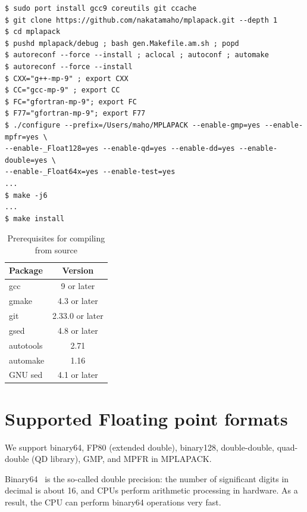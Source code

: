 \documentclass[12pt]{article}
\begin{document}
\begin{verbatim}
$ sudo port install gcc9 coreutils git ccache
$ git clone https://github.com/nakatamaho/mplapack.git --depth 1
$ cd mplapack
$ pushd mplapack/debug ; bash gen.Makefile.am.sh ; popd
$ autoreconf --force --install ; aclocal ; autoconf ; automake
$ autoreconf --force --install
$ CXX="g++-mp-9" ; export CXX
$ CC="gcc-mp-9" ; export CC
$ FC="gfortran-mp-9"; export FC
$ F77="gfortran-mp-9"; export F77
$ ./configure --prefix=/Users/maho/MPLAPACK --enable-gmp=yes --enable-mpfr=yes \
--enable-_Float128=yes --enable-qd=yes --enable-dd=yes --enable-double=yes \
--enable-_Float64x=yes --enable-test=yes
...
$ make -j6
...
$ make install
\end{verbatim}

\begin{table}
\caption{Prerequisites for compiling from source}
\begin{center}\label{prerequisites}
\begin{tabular}{lc}
Package & Version \\ \hline
gcc & 9 or later \\
gmake & 4.3 or later \\
git & 2.33.0 or later\\
gsed & 4.8 or later \\
autotools & 2.71 \\
automake & 1.16 \\ 
GNU sed & 4.1 or later \\ 
\hline
\end{tabular}
\end{center}
\end{table}

\section{Supported Floating point formats}
\label{sec:floatingpointformat} 
We support binary64, FP80 (extended double), binary128, double-double, quad-double (QD library), GMP, and MPFR in MPLAPACK. 

Binary64~\cite{4610935} is the so-called double precision: the number of significant digits in decimal is about 16, and CPUs perform arithmetic processing in hardware. As a result, the CPU can perform binary64 operations very fast.
\end{document}
